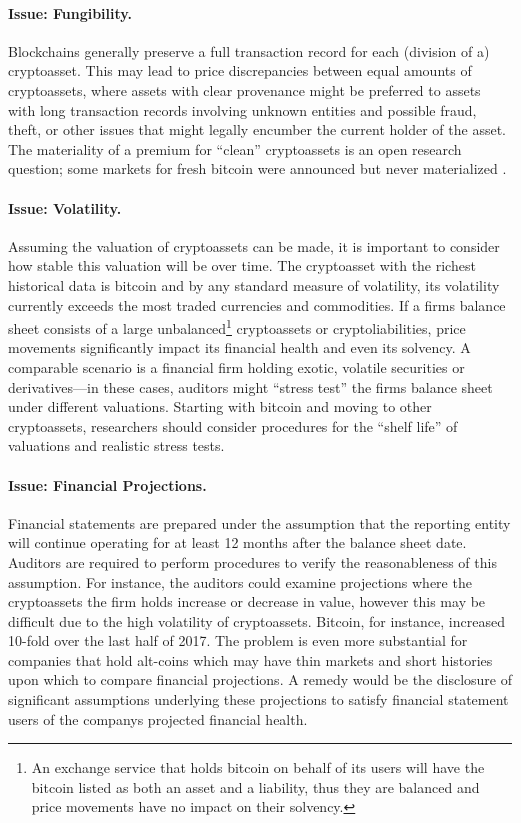 \paragraph{Issue: Fungibility.} Blockchains generally preserve a full transaction record for each (division of a) cryptoasset. This may lead to price discrepancies between equal amounts of cryptoassets, where assets with clear provenance might be preferred to assets with long transaction records involving unknown entities and possible fraud, theft, or other issues that might legally encumber the current holder of the asset. The materiality of a premium for ``clean'' cryptoassets is an open research question; some markets for fresh bitcoin were announced but never materialized \todo{[c]}. 

\paragraph{Issue: Volatility.} Assuming the valuation of cryptoassets can be made, it is important to consider how stable this valuation will be over time. The cryptoasset with the richest historical data is bitcoin and by any standard measure of volatility, its volatility currently exceeds the most traded currencies and commodities. If a firm\textquotesingle s balance sheet consists of a large unbalanced\footnote{An exchange service that holds bitcoin on behalf of its users will have the bitcoin listed as both an asset and a liability, thus they are balanced and price movements have no impact on their solvency.} cryptoassets or cryptoliabilities, price movements significantly impact its financial health and even its solvency. A comparable scenario is a financial firm holding exotic, volatile securities or derivatives---in these cases, auditors might ``stress test'' the firm\textquotesingle s balance sheet under different valuations. Starting with bitcoin and moving to other cryptoassets, researchers should consider procedures for the ``shelf life'' of valuations and realistic stress tests.

\paragraph{Issue: Financial Projections.} Financial statements are prepared under the assumption that the reporting entity will continue operating for at least 12 months after the balance sheet date. Auditors are required to perform procedures to verify the reasonableness of this assumption. For instance, the auditors could examine projections where the cryptoassets the firm holds increase or decrease in value, however this may be difficult due to  the high volatility of cryptoassets. Bitcoin, for instance, increased 10-fold over the last half of 2017. The problem is even more substantial for companies that hold alt-coins which may have thin markets and short histories upon which to compare financial projections. A remedy would be the disclosure of significant assumptions underlying these projections to satisfy financial statement users of the company\textquotesingle s projected financial health. 

